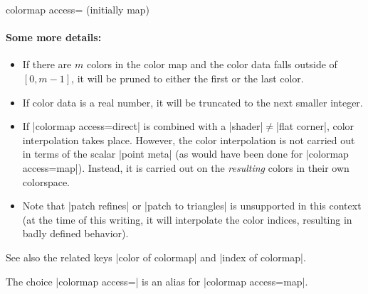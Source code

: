 \begin{pgfplotskey}{colormap access= (initially map)}
	\paragraph{Some more details:}
	\begin{itemize}
		\item If there are $m$ colors in the color map and the color data falls outside of $[0,m-1]$, it will be pruned to either the first or the last color.
		\item If color data is a real number, it will be truncated to the next smaller integer.
		\item If |colormap access=direct| is combined with a |shader|$\neq$|flat corner|, color interpolation takes place. However, the color interpolation is not carried out in terms of the scalar |point meta| (as would have been done for |colormap access=map|). Instead, it is carried out on the \emph{resulting} colors in their own colorspace. 

		\item Note that |patch refines| or |patch to triangles| is unsupported in this context (at the time of this writing, it will interpolate the color indices, resulting in badly defined behavior).

	\end{itemize}

	See also the related keys |color of colormap| and |index of colormap|.

	
	The choice |colormap access=| is an alias for |colormap access=map|.


\end{pgfplotskey}
